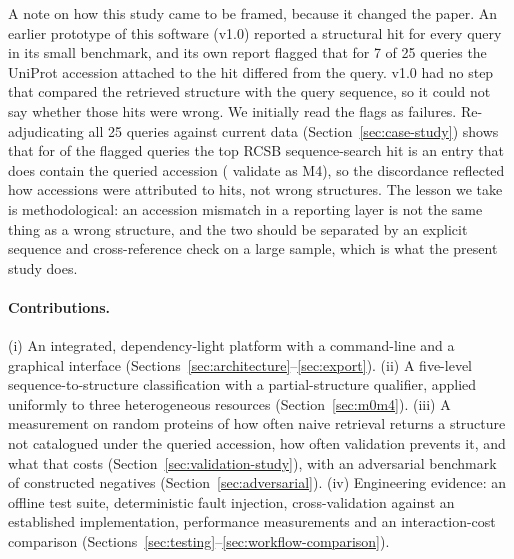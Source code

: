 A note on how this study came to be framed, because it changed the paper. An
earlier prototype of this software (v1.0) reported a structural hit for every
query in its small benchmark, and its own report flagged that for 7 of 25
queries the UniProt accession attached to the hit differed from the query.
v1.0 had no step that compared the retrieved structure with the query sequence,
so it could not say whether those hits were wrong. We initially read the flags
as failures. Re-adjudicating all 25 queries against current data
(Section~\ref{sec:case-study}) shows that for  of the
 flagged queries the top RCSB sequence-search hit is an entry that
does contain the queried accession ( validate as M4), so the
discordance reflected how accessions were attributed to hits, not wrong structures. The lesson we take is methodological:
an accession mismatch in a reporting layer is not the same thing as a wrong
structure, and the two should be separated by an explicit sequence and
cross-reference check on a large sample, which is what the present study does.

\paragraph{Contributions.}
(i) An integrated, dependency-light platform with a command-line and a graphical
interface (Sections~\ref{sec:architecture}--\ref{sec:export}).
(ii) A five-level sequence-to-structure classification with a partial-structure
qualifier, applied uniformly to three heterogeneous resources
(Section~\ref{sec:m0m4}).
(iii) A measurement on  random proteins of how often naive retrieval
returns a structure not catalogued under the queried accession, how often
validation prevents it, and what that costs
(Section~\ref{sec:validation-study}), with an adversarial benchmark of
constructed negatives (Section~\ref{sec:adversarial}).
(iv) Engineering evidence: an offline test suite, deterministic fault
injection, cross-validation against an established implementation, performance
measurements and an interaction-cost comparison
(Sections~\ref{sec:testing}--\ref{sec:workflow-comparison}).
